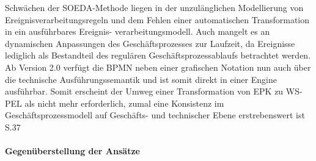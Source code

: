 Schwächen der SOEDA-Methode liegen in der unzulänglichen Modellierung von Ereignisverarbeitungsregeln und dem Fehlen einer automatischen Transformation in ein ausführbares Ereignis- verarbeitungsmodell. Auch mangelt es an dynamischen Anpassungen des Geschäftsprozesses zur Laufzeit, da Ereignisse lediglich als Bestandteil des regulären Geschäftsprozessablaufs betrachtet werden. Ab Version 2.0 verfügt die BPMN neben einer grafischen Notation nun auch über die technische Ausführungssemantik und ist somit direkt in einer Engine ausführbar. Somit erscheint der Umweg einer Transformation von EPK zu WS-PEL als nicht mehr erforderlich, zumal eine Konsistenz im Geschäftsprozessmodell auf Geschäfts- und technischer Ebene erstrebenswert ist
\cite{MatthiasWieland.2009} 
\cite{Bruns.2010}S.37
\cite{RobraBissantz.2009}




\paragraph{Gegenüberstellung der Ansätze}